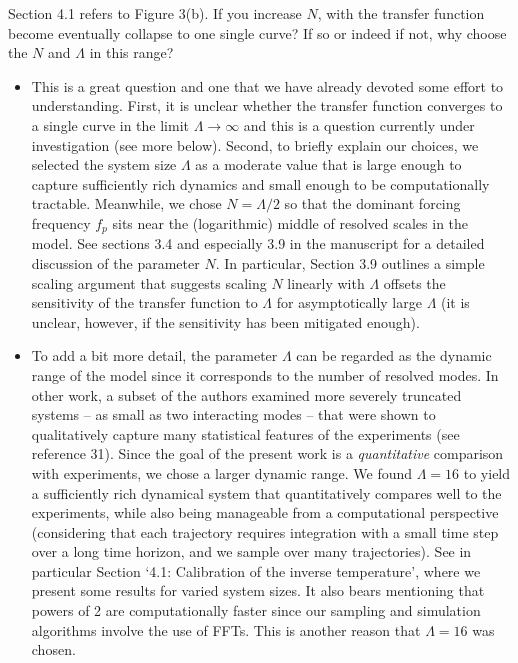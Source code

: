 \documentclass[11pt]{article}
\newcommand{\comment}[1]{{\color{blue} #1}}
\begin{document}
\noindent
\comment{Section 4.1 refers to Figure 3(b). If you increase $N$, with the transfer function become eventually collapse to one single curve? If so or indeed if not, why choose the $N$ and $\Lambda$ in this range?}

\begin{itemize}
\item This is a great question and one that we have already devoted some effort to understanding. First, it is unclear whether the transfer function converges to a single curve in the limit $\Lambda \to \infty$ and this is a question currently under investigation (see more below). Second, to briefly explain our choices, we selected the system size $\Lambda$ as a moderate value that is large enough to capture sufficiently rich dynamics and small enough to be computationally tractable. Meanwhile, we chose $N = \Lambda / 2$ so that the dominant forcing frequency $f_p$ sits near the (logarithmic) middle of resolved scales in the model. See sections 3.4 and especially 3.9 in the manuscript for a detailed discussion of the parameter $N$. In particular, Section 3.9 outlines a simple scaling argument that suggests scaling $N$ linearly with $\Lambda$ offsets the sensitivity of the transfer function to $\Lambda$ for asymptotically large $\Lambda$ (it is unclear, however, if the sensitivity has been mitigated enough).

\item To add a bit more detail, the parameter $\Lambda$ can be regarded as the dynamic range of the model since it corresponds to the number of resolved modes. In other work, a subset of the authors examined more severely truncated systems -- as small as two interacting modes -- that were shown to qualitatively capture many statistical features of the experiments (see reference 31). Since the goal of the present work is a {\em quantitative} comparison with experiments, we chose a larger dynamic range. We found $\Lambda = 16$ to yield a sufficiently rich dynamical system that quantitatively compares well to the experiments, while also being manageable from a computational perspective (considering that each trajectory requires integration with a small time step over a long time horizon, and we sample over many trajectories). See in particular Section `4.1: Calibration of the inverse temperature', where we present some results for varied system sizes. It also bears mentioning that powers of 2 are computationally faster since our sampling and simulation algorithms involve the use of FFTs. This is another reason that $\Lambda = 16$ was chosen.
	

\end{itemize}
\end{document}
